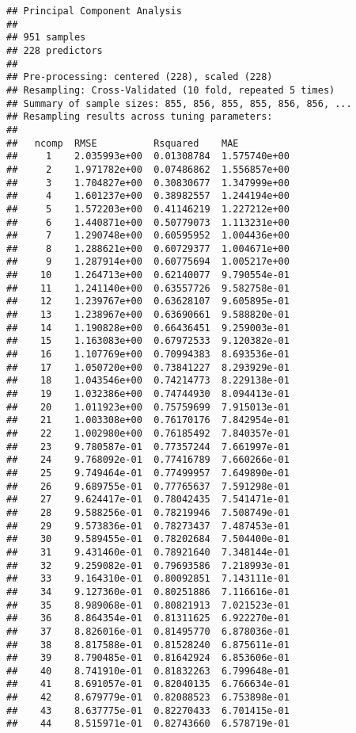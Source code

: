 \documentclass[]{article}
\begin{document}
\begin{verbatim}
## Principal Component Analysis 
## 
## 951 samples
## 228 predictors
## 
## Pre-processing: centered (228), scaled (228) 
## Resampling: Cross-Validated (10 fold, repeated 5 times) 
## Summary of sample sizes: 855, 856, 855, 855, 856, 856, ... 
## Resampling results across tuning parameters:
## 
##   ncomp  RMSE          Rsquared    MAE         
##     1    2.035993e+00  0.01308784  1.575740e+00
##     2    1.971782e+00  0.07486862  1.556857e+00
##     3    1.704827e+00  0.30830677  1.347999e+00
##     4    1.601237e+00  0.38982557  1.244194e+00
##     5    1.572203e+00  0.41146219  1.227212e+00
##     6    1.440871e+00  0.50779073  1.113231e+00
##     7    1.290748e+00  0.60595952  1.004436e+00
##     8    1.288621e+00  0.60729377  1.004671e+00
##     9    1.287914e+00  0.60775694  1.005217e+00
##    10    1.264713e+00  0.62140077  9.790554e-01
##    11    1.241140e+00  0.63557726  9.582758e-01
##    12    1.239767e+00  0.63628107  9.605895e-01
##    13    1.238967e+00  0.63690661  9.588820e-01
##    14    1.190828e+00  0.66436451  9.259003e-01
##    15    1.163083e+00  0.67972533  9.120382e-01
##    16    1.107769e+00  0.70994383  8.693536e-01
##    17    1.050720e+00  0.73841227  8.293929e-01
##    18    1.043546e+00  0.74214773  8.229138e-01
##    19    1.032386e+00  0.74744930  8.094413e-01
##    20    1.011923e+00  0.75759699  7.915013e-01
##    21    1.003308e+00  0.76170176  7.842954e-01
##    22    1.002980e+00  0.76185492  7.840357e-01
##    23    9.780587e-01  0.77357244  7.661997e-01
##    24    9.768092e-01  0.77416789  7.660266e-01
##    25    9.749464e-01  0.77499957  7.649890e-01
##    26    9.689755e-01  0.77765637  7.591298e-01
##    27    9.624417e-01  0.78042435  7.541471e-01
##    28    9.588256e-01  0.78219946  7.508749e-01
##    29    9.573836e-01  0.78273437  7.487453e-01
##    30    9.589455e-01  0.78202684  7.504400e-01
##    31    9.431460e-01  0.78921640  7.348144e-01
##    32    9.259082e-01  0.79693586  7.218993e-01
##    33    9.164310e-01  0.80092851  7.143111e-01
##    34    9.127360e-01  0.80251886  7.116616e-01
##    35    8.989068e-01  0.80821913  7.021523e-01
##    36    8.864354e-01  0.81311625  6.922270e-01
##    37    8.826016e-01  0.81495770  6.878036e-01
##    38    8.817588e-01  0.81528240  6.875611e-01
##    39    8.790485e-01  0.81642924  6.853606e-01
##    40    8.741910e-01  0.81832263  6.799648e-01
##    41    8.691057e-01  0.82040135  6.766634e-01
##    42    8.679779e-01  0.82088523  6.753898e-01
##    43    8.637775e-01  0.82270433  6.701415e-01
##    44    8.515971e-01  0.82743660  6.578719e-01

\end{verbatim}
\end{document}
